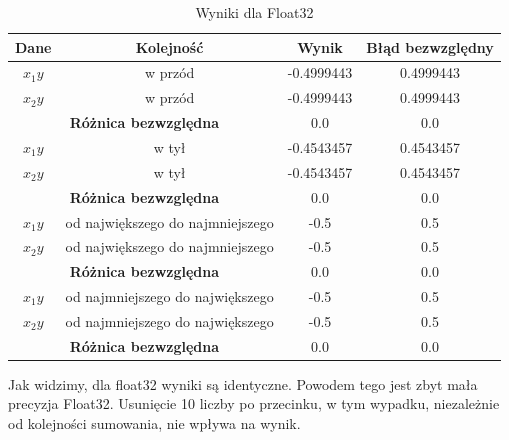 \documentclass{article}
\begin{document}
{
\begin{table}[H]
  \centering
  \begin{tabular}{|c|c|c|c|}
    \toprule
    Dane & Kolejność & Wynik & Błąd bezwzględny\\
    \midrule
    $x_1y$ & w przód & -0.4999443 & 0.4999443 \\
    $x_2y$ & w przód & -0.4999443 & 0.4999443 \\
    \hline  %
    \multicolumn{2}{|c|}{\textbf{Różnica bezwzględna}} & 0.0 & 0.0 \\
    \hline  %
    $x_1y$ & w tył & -0.4543457 & 0.4543457 \\
    $x_2y$ & w tył & -0.4543457 & 0.4543457 \\
    \hline  %
    \multicolumn{2}{|c|}{\textbf{Różnica bezwzględna}} & 0.0 & 0.0 \\
    \hline  %
    $x_1y$ & od największego do najmniejszego & -0.5 & 0.5 \\
    $x_2y$ & od największego do najmniejszego & -0.5 & 0.5 \\
    \hline  %
    \multicolumn{2}{|c|}{\textbf{Różnica bezwzględna}} & 0.0 & 0.0 \\
    \hline  %
    $x_1y$ & od najmniejszego do największego & -0.5 & 0.5 \\
    $x_2y$ & od najmniejszego do największego & -0.5 & 0.5 \\
    \hline  %
    \multicolumn{2}{|c|}{\textbf{Różnica bezwzględna}} & 0.0 & 0.0 \\
    \bottomrule
  \end{tabular}
  \caption{Wyniki dla Float32}
\end{table}
}
Jak widzimy, dla float32 wyniki są identyczne. Powodem
tego jest zbyt mała precyzja Float32. Usunięcie 10 liczby
po przecinku, w tym wypadku, niezależnie od kolejności sumowania,
nie wpływa na wynik.
\end{document}

